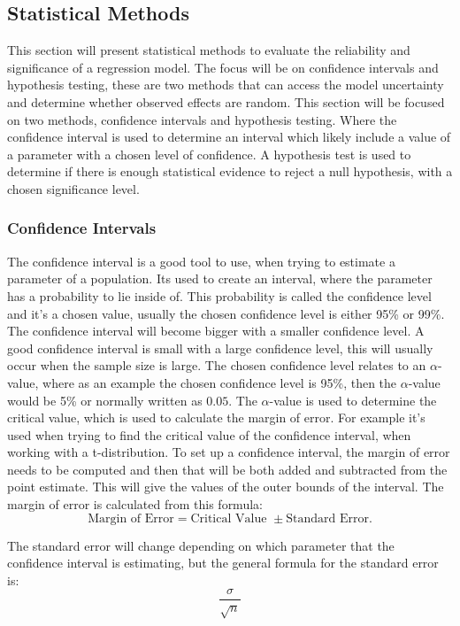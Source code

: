 \subsection{Statistical Methods}
This section will present statistical methods to evaluate the reliability and significance of a regression model. The focus will be on confidence intervals and hypothesis testing, these are two methods that can access the model uncertainty and determine whether observed effects are random. This section will be focused on two methods, confidence intervals and hypothesis testing. Where the confidence interval is used to determine an interval which likely include a value of a parameter with a chosen level of confidence. A hypothesis test is used to determine if there is enough statistical evidence to reject a null hypothesis, with a chosen significance level.
\subsubsection{Confidence Intervals}
The confidence interval is a good tool to use, when trying to estimate a parameter of a population. Its used to create an interval, where the parameter has a probability to lie inside of. This probability is called the confidence level and it's a chosen value, usually the chosen confidence level is either 95\% or 99\%. The confidence interval will become bigger with a smaller confidence level. A good confidence interval is small with a large confidence level, this will usually occur when the sample size is large. The chosen confidence level relates to an $\alpha$-value, where as an example the chosen confidence level is 95\%, then the $\alpha$-value would be 5\% or normally written as $0.05$. The $\alpha$-value is used to determine the critical value, which is used to calculate the margin of error. For example it's used when trying to find the critical value of the confidence interval, when working with a t-distribution.
\newline
To set up a confidence interval, the margin of error needs to be computed and then that will be both added and subtracted from the point estimate. This will give the values of the outer bounds of the interval. The margin of error is calculated from this formula:
\begin{equation}
	\text{Margin of Error} = \text{Critical Value } \pm \text{Standard Error}.
\end{equation}

\noindent The standard error will change depending on which parameter that the confidence interval is estimating, but the general formula for the standard error is:
\begin{equation}
	\frac{\sigma}{\sqrt{n}}
\end{equation}

